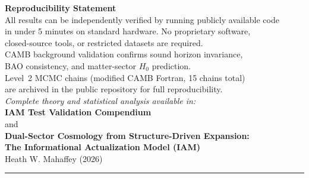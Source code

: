 \documentclass[11pt]{article}
\begin{document}
\begin{center}
\textbf{Reproducibility Statement} \\[0.5em]
All results can be independently verified by running publicly available code \\
in under 5 minutes on standard hardware. No proprietary software, \\
closed-source tools, or restricted datasets are required. \\
CAMB background validation confirms sound horizon invariance, \\
BAO consistency, and matter-sector $H_0$ prediction. \\
Level~2 MCMC chains (modified CAMB Fortran, 15 chains total) \\
are archived in the public repository for full reproducibility. \\[1em]

\textit{Complete theory and statistical analysis available in:} \\
\textbf{IAM Test Validation Compendium} \\
and \\
\textbf{Dual-Sector Cosmology from Structure-Driven Expansion:} \\
\textbf{The Informational Actualization Model (IAM)} \\
Heath W. Mahaffey (2026)
\end{center}

\noindent\rule{\textwidth}{0.4pt}
\end{document}
